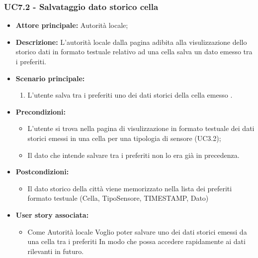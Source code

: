 \subsubsection{UC7.2 - Salvataggio dato storico cella}
\begin{itemize}
    \item \textbf{Attore principale:} Autorità locale;
    \item \textbf{Descrizione:} L’autorità locale dalla pagina adibita alla visulizzazione dello storico dati in formato testuale relativo ad una cella salva un dato emesso tra i preferiti.
    \item \textbf{Scenario principale:}
          \begin{enumerate}
              \item L'utente salva tra i preferiti uno dei dati storici della cella emesso .
          \end{enumerate}
    \item \textbf{Precondizioni:}
          \begin{itemize}
              \item  L'utente si trova nella pagina di visulizzazione in formato testuale dei dati storici emessi in una cella per una tipologia di sensore (UC3.2);
              \item  Il dato che intende salvare tra i preferiti non lo era già in precedenza.
          \end{itemize}
    \item \textbf{Postcondizioni:}
          \begin{itemize}
              \item  Il dato storico della città viene memorizzato nella lista dei preferiti formato testuale (Cella,
                    TipoSensore, TIMESTAMP,
                    Dato)
          \end{itemize}
    \item \textbf{User story associata:}
          \begin{itemize}
              \item Come Autorità locale
                    Voglio poter salvare uno dei dati storici emessi da una cella tra i preferiti
                    In modo che possa accedere rapidamente ai dati rilevanti in futuro.
          \end{itemize}
\end{itemize}
